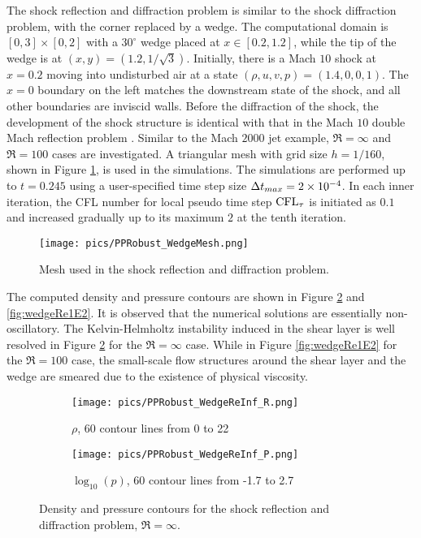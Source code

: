 The shock reflection and diffraction problem \cite{zhang2017positivity} is similar to the shock diffraction problem,
with the corner replaced by a wedge. The computational domain is $[0,3]\times[0,2]$
with a $30^\circ$ wedge placed at $x\in[0.2,1.2]$, while the
tip of the wedge is at $(x,y) = (1.2, 1/\sqrt{3})$.
Initially, there is a Mach $10$ shock at $x=0.2$ moving into undisturbed air at a state $(\rho, u, v, p) = (1.4,0,0,1)$. The $x=0$ boundary on
the left matches the downstream state of the shock, and all other boundaries
are inviscid walls.
Before the diffraction of the shock, the development
of the shock structure is identical with that in the Mach $10$ double Mach reflection problem \cite{woodward1984dmr}.
Similar to the Mach $2000$ jet example, $\Re=\infty$ and $\Re=100$ cases
are investigated. A triangular mesh with grid size $h = 1/160$,
shown in Figure \ref{fig:wedgeMesh}, is used in the simulations.
The simulations are performed up to $t=0.245$ using
a user-specified time step size $\mathrm\Delta t_{max}= 2\times10^{-4}$.
In each inner iteration, the CFL number for local pseudo time step $\text{CFL}_\tau$ is initiated as $0.1$
and increased gradually up to its maximum $2$ at the tenth iteration.

\begin{figure}[htbp]
    \centering
    \texttt{[image: pics/PPRobust\_WedgeMesh.png]}
    \caption{Mesh used in the shock reflection and diffraction problem.}
    \label{fig:wedgeMesh}
\end{figure}

The computed density and pressure contours are shown in Figure \ref{fig:wedgeReInf} and \ref{fig:wedgeRe1E2}.
It is observed that the numerical solutions are essentially non-oscillatory.
The Kelvin-Helmholtz instability induced in the shear layer is well resolved in Figure \ref{fig:wedgeReInf} for the $\Re=\infty$ case.
While in Figure  \ref{fig:wedgeRe1E2} for the $\Re=100$ case,
the small-scale flow structures around the shear layer and the wedge are smeared  due to the existence of physical viscosity.

\begin{figure}[htbp]
    \centering
    \begin{subfigure}{0.5\textwidth}
        \texttt{[image: pics/PPRobust\_WedgeReInf\_R.png]}
        \caption[]{$\rho$, 60 contour lines from 0 to 22}
    \end{subfigure}\hfill
    \begin{subfigure}{0.5\textwidth}
        \texttt{[image: pics/PPRobust\_WedgeReInf\_P.png]}
        \caption[]{$\log_{10}(p)$, 60 contour lines from -1.7 to 2.7}
    \end{subfigure}
    \caption{Density and pressure contours for the shock reflection and diffraction problem, $\Re=\infty$.}
    \label{fig:wedgeReInf}
\end{figure}

